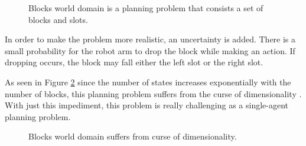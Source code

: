\documentclass{ituphdreport}
\begin{document}
\begin{figure}[h]
	\begin{center}
	\end{center}
	\caption{Blocks world domain is a planning problem that consists a set of blocks and slots. 
		\label{fig:blocksworld}}
\end{figure}

In order to make the problem more realistic, an uncertainty is added. There is a small probability for the robot arm to drop the block while making an action. If dropping occurs, the block may fall either the left slot or the right slot. 

As seen in Figure \ref{fig:blocksworld_curseofdimensionality} since the number of states increases exponentially with the number of blocks, this planning problem suffers from the curse of dimensionality \cite{irodova2005reinforcement}. With just this impediment, this problem is really challenging as a single-agent planning problem.

\begin{figure}[h]
	\begin{center}
	\end{center}
	\caption{Blocks world domain suffers from curse of dimensionality. 
		\label{fig:blocksworld_curseofdimensionality}}
\end{figure}
\end{document}
